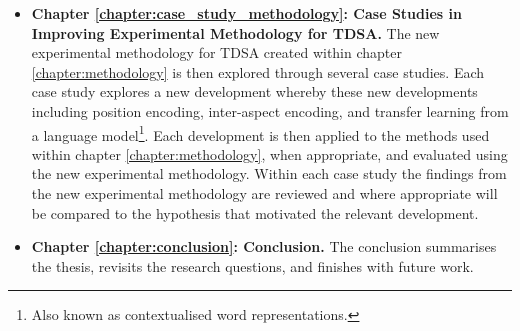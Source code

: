 \begin{itemize}
    \item \textbf{Chapter \ref{chapter:case_study_methodology}: Case Studies in Improving Experimental Methodology for TDSA.}\newline
    The new experimental methodology for TDSA created within chapter \ref{chapter:methodology} is then explored through several case studies. Each case study explores a new development whereby these new developments including position encoding, inter-aspect encoding, and transfer learning from a language model\footnote{Also known as contextualised word representations.}. Each development is then applied to the methods used within chapter \ref{chapter:methodology}, when appropriate, and evaluated using the new experimental methodology. Within each case study the findings from the new experimental methodology are reviewed and where appropriate will be compared to the hypothesis that motivated the relevant development.   
    \item \textbf{Chapter \ref{chapter:conclusion}: Conclusion.}\newline
    The conclusion summarises the thesis, revisits the research questions, and finishes with future work.
\end{itemize}